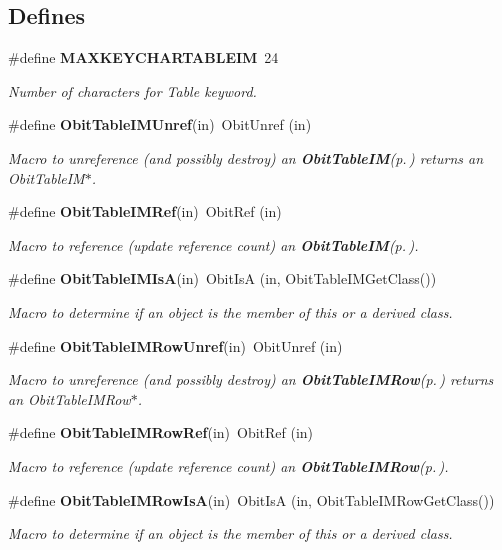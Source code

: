 \subsection*{Defines}
\begin{CompactItemize}
\item 
\#define {\bf MAXKEYCHARTABLEIM}\ 24
\begin{CompactList}\small\item\em Number of characters for Table keyword. \item\end{CompactList}\item 
\#define {\bf Obit\-Table\-IMUnref}(in)\ Obit\-Unref (in)
\begin{CompactList}\small\item\em Macro to unreference (and possibly destroy) an {\bf Obit\-Table\-IM}{\rm (p.\,\pageref{structObitTableIM})} returns an Obit\-Table\-IM$\ast$. \item\end{CompactList}\item 
\#define {\bf Obit\-Table\-IMRef}(in)\ Obit\-Ref (in)
\begin{CompactList}\small\item\em Macro to reference (update reference count) an {\bf Obit\-Table\-IM}{\rm (p.\,\pageref{structObitTableIM})}. \item\end{CompactList}\item 
\#define {\bf Obit\-Table\-IMIs\-A}(in)\ Obit\-Is\-A (in, Obit\-Table\-IMGet\-Class())
\begin{CompactList}\small\item\em Macro to determine if an object is the member of this or a derived class. \item\end{CompactList}\item 
\#define {\bf Obit\-Table\-IMRow\-Unref}(in)\ Obit\-Unref (in)
\begin{CompactList}\small\item\em Macro to unreference (and possibly destroy) an {\bf Obit\-Table\-IMRow}{\rm (p.\,\pageref{structObitTableIMRow})} returns an Obit\-Table\-IMRow$\ast$. \item\end{CompactList}\item 
\#define {\bf Obit\-Table\-IMRow\-Ref}(in)\ Obit\-Ref (in)
\begin{CompactList}\small\item\em Macro to reference (update reference count) an {\bf Obit\-Table\-IMRow}{\rm (p.\,\pageref{structObitTableIMRow})}. \item\end{CompactList}\item 
\#define {\bf Obit\-Table\-IMRow\-Is\-A}(in)\ Obit\-Is\-A (in, Obit\-Table\-IMRow\-Get\-Class())
\begin{CompactList}\small\item\em Macro to determine if an object is the member of this or a derived class. \item\end{CompactList}\end{CompactItemize}

